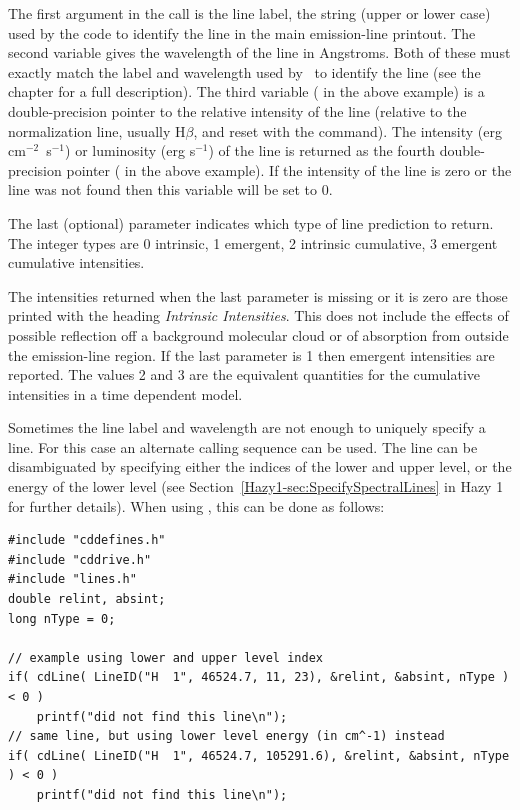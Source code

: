 The first argument in the call is the line label, the
string (upper or lower case) used by the code to identify
the line in the main emission-line printout.  The second variable gives
the wavelength of the line in Angstroms.  Both of these must exactly match
the label and wavelength used by \Cloudy\ to identify the line
(see the chapter  for a full description).
The third variable ( in the above
example) is a double-precision pointer to the relative intensity of the
line (relative to the normalization line, usually H$\beta$,
and reset with the
 command).
The intensity (erg cm$^{-2}$~s$^{-1}$) or luminosity (erg s$^{-1}$)
of the line is returned as the fourth double-precision pointer
( in the above example).
If the intensity of the line is zero or
the line was not found then this variable will be set to 0.

The last (optional) parameter indicates which type of line prediction to return.
The integer types are
 0 intrinsic, 
 1 emergent, 
 2 intrinsic cumulative, 
 3 emergent cumulative
 intensities.

The intensities returned when the last parameter is missing
or it is zero are those printed with the
heading \emph{Intrinsic Intensities}.
This does not include the effects of possible
reflection off a background molecular cloud or of absorption from outside
the emission-line region.
If the last parameter is 1 then emergent
intensities are reported.
The values 2 and 3 are the equivalent quantities for the cumulative
intensities in a time dependent model.

Sometimes the line label and wavelength are not enough to uniquely specify a
line. For this case an alternate calling sequence can be used. The line can be
disambiguated by specifying either the indices of the lower and upper level,
or the energy of the lower level (see Section~\ref{Hazy1-sec:SpecifySpectralLines}
in Hazy 1 for further details). When using , this can be done as
follows:
\begin{verbatim}
#include "cddefines.h"
#include "cddrive.h"
#include "lines.h"
double relint, absint;
long nType = 0;

// example using lower and upper level index
if( cdLine( LineID("H  1", 46524.7, 11, 23), &relint, &absint, nType ) < 0 )
    printf("did not find this line\n");
// same line, but using lower level energy (in cm^-1) instead
if( cdLine( LineID("H  1", 46524.7, 105291.6), &relint, &absint, nType ) < 0 )
    printf("did not find this line\n");
\end{verbatim}

